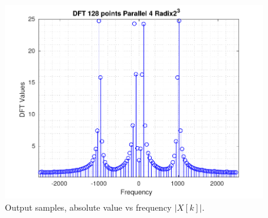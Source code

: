 \begin{frame}
\begin{columns}[t,onlytextwidth]
\begin{column}{0.45\linewidth}
\begin{figure}[h!]
	    		\includegraphics[height=0.35\paperheight]{./image/output_fx.pdf}
				\caption{\tiny Output samples, absolute value vs frequency $|X[k]|$.}
	    	\end{figure}  
   		\end{column}
	\end{columns}  
\end{frame}


